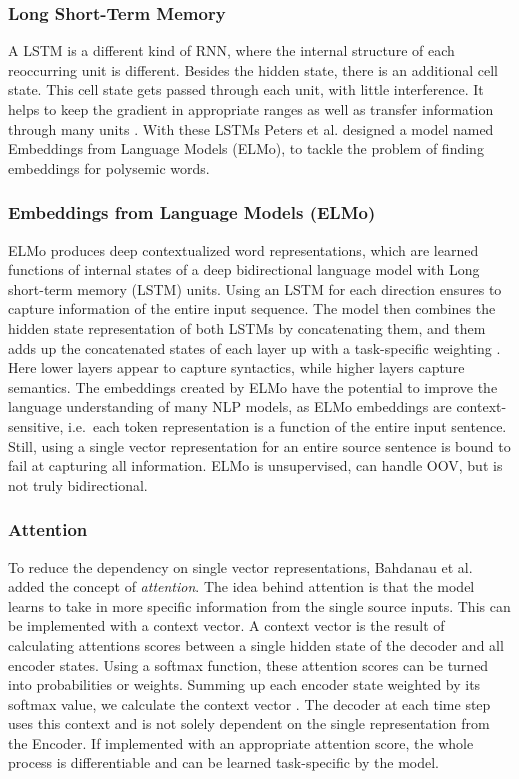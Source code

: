 \documentclass[11pt, a4paper]{amsart}
\begin{document}
\subsubsection{Long Short-Term Memory}

A LSTM is a different kind of RNN, where the internal structure of each reoccurring unit is different. Besides the hidden state, there is an additional cell state. This cell state gets passed through each unit, with little interference. It helps to keep the gradient in appropriate ranges as well as transfer information through many units \cite{karpathyRNN}. With these LSTMs Peters et al. designed a model named Embeddings from Language Models (ELMo), to tackle the problem of finding embeddings for polysemic words.

\subsubsection{Embeddings from Language Models (ELMo)}

ELMo produces deep contextualized word representations, which are learned functions of internal states of a deep bidirectional language model with Long short-term memory (LSTM) units.
Using an LSTM for each direction ensures to capture information of the entire input sequence. 
The model then combines the hidden state representation of both LSTMs by concatenating them, and them adds up the concatenated states of each layer up with a task-specific weighting \cite{DBLP:conf/naacl/PetersNIGCLZ18}.  
Here lower layers appear to capture syntactics, while higher layers capture semantics.
The embeddings created by ELMo have the potential to improve the language understanding of many NLP models, as  ELMo embeddings are context-sensitive, i.e.\ each token representation is a function of the entire input sentence.
Still, using a single vector representation for an entire source sentence is bound to fail at capturing all information.
ELMo is unsupervised, can handle OOV, but is not truly bidirectional.

\subsubsection{Attention}

To reduce the dependency on single vector representations, Bahdanau et al. added the concept of \emph{attention}.
The idea behind attention is that the model learns to take in more specific information from the single source inputs. 
This can be implemented with a context vector. 
A context vector is the result of calculating attentions scores between a single hidden state of the decoder and all encoder states. 
Using a softmax function, these attention scores can be turned into probabilities or weights. 
Summing up each encoder state weighted by its softmax value, we calculate the context vector \cite{DBLP:journals/corr/BahdanauCB14}.
The decoder at each time step uses this context and is not solely dependent on the single representation from the Encoder. 
If implemented with an appropriate attention score, the whole process is differentiable and can be learned task-specific by the model.
\end{document}
